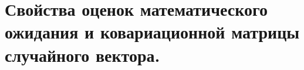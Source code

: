\documentclass[polytech/stats/exam-2023/stats-exam-2023.tex]{subfiles}
\begin{document}
\section{Свойства оценок математического ожидания и ковариационной матрицы случайного вектора.}
\end{document}
